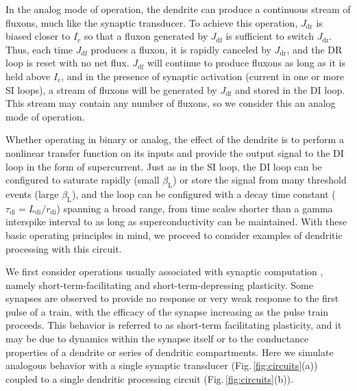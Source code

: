 \documentclass[twocolumn]{article}
\begin{document}
In the analog mode of operation, the dendrite can produce a continuous stream of fluxons, much like the synaptic transducer. To achieve this operation, $J_{\mathrm{dr}}$ is biased closer to $I_{\mathrm{c}}$ so that a fluxon generated by $J_{\mathrm{df}}$ is sufficient to switch $J_{\mathrm{dr}}$. Thus, each time $J_{\mathrm{df}}$ produces a fluxon, it is rapidly canceled by $J_{\mathrm{dr}}$, and the DR loop is reset with no net flux. $J_{\mathrm{df}}$ will continue to produce fluxons as long as it is held above $I_{\mathrm{c}}$, and in the presence of synaptic activation (current in one or more SI loops), a stream of fluxons will be generated by $J_{\mathrm{df}}$ and stored in the DI loop. This stream may contain any number of fluxons, so we consider this an analog mode of operation.

Whether operating in binary or analog, the effect of the dendrite is to perform a nonlinear transfer function on its inputs and provide the output signal to the DI loop in the form of supercurrent. Just as in the SI loop, the DI loop can be configured to saturate rapidly (small $\beta_{\mathrm{L}}$) or store the signal from many threshold events (large $\beta_{\mathrm{L}}$), and the loop can be configured with a decay time constant ($\tau_{\mathrm{di}} = L_{\mathrm{di}} / r_{\mathrm{di}}$) spanning a broad range, from time scales shorter than a gamma interspike interval to as long as superconductivity can be maintained. With these basic operating principles in mind, we proceed to consider examples of dendritic processing with this circuit.

We first consider operations usually associated with synaptic computation \cite{abre2004}, namely short-term-facilitating and short-term-depressing plasticity. Some synapses are observed to provide no response or very weak response to the first pulse of a train, with the efficacy of the synapse increasing as the pulse train proceeds. This behavior is referred to as short-term facilitating plasticity, and it may be due to dynamics within the synapse itself or to the conductance properties of a dendrite or series of dendritic compartments. Here we simulate analogous behavior with a single synaptic transducer (Fig.\,\ref{fig:circuits}(a)) coupled to a single dendritic processing circuit (Fig.\,\ref{fig:circuits}(b)). 
\end{document}
